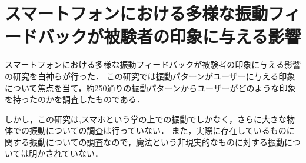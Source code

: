 \section{スマートフォンにおける多様な振動フィードバックが被験者の印象に与える影響}
スマートフォンにおける多様な振動フィードバックが被験者の印象に与える影響\cite{smart}の研究を白神らが行った．
この研究では振動パターンがユーザーに与える印象について焦点を当て，約250通りの振動パターンからユーザーがどのような印象を持ったのかを調査したものである．


しかし，この研究は,スマホという掌の上での振動でしかなく，さらに大きな物体での振動についての調査は行っていない．
また，実際に存在しているものに関する振動についての調査なので，魔法という非現実的なものに対する振動については明かされていない．





